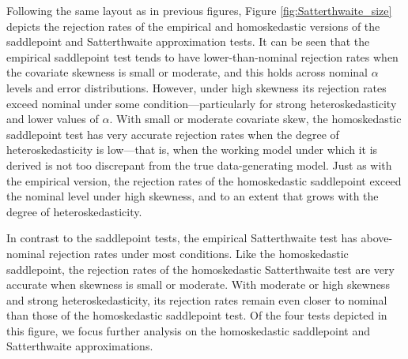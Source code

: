 \documentclass[12pt]{article}\usepackage[]{graphicx}\usepackage[]{color}
\begin{document}
Following the same layout as in previous figures, Figure \ref{fig:Satterthwaite_size} depicts the rejection rates of the empirical and homoskedastic versions of the saddlepoint and Satterthwaite approximation tests. It can be seen that the empirical saddlepoint test tends to have lower-than-nominal rejection rates when the covariate skewness is small or moderate, and this holds across nominal $\alpha$ levels and error distributions. However, under high skewness its rejection rates exceed nominal under some condition---particularly for strong heteroskedasticity and lower values of $\alpha$. With small or moderate covariate skew, the homoskedastic saddlepoint test has very accurate rejection rates when the degree of heteroskedasticity is low---that is, when the working model under which it is derived is not too discrepant from the true data-generating model. Just as with the empirical version, the rejection rates of the homoskedastic saddlepoint exceed the nominal level under high skewness, and to an extent that grows with the degree of heteroskedasticity. 

In contrast to the saddlepoint tests, the empirical Satterthwaite test has above-nominal rejection rates under most conditions. Like the homoskedastic saddlepoint, the rejection rates of the homoskedastic Satterthwaite test are very accurate when skewness is small or moderate. With moderate or high skewness and strong heteroskedasticity, its rejection rates remain even closer to nominal than those of the homoskedastic saddlepoint test. Of the four tests depicted in this figure, we focus further analysis on the homoskedastic saddlepoint and Satterthwaite approximations.
\end{document}
